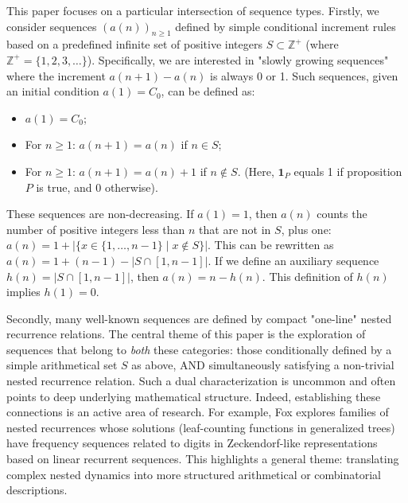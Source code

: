 \documentclass[11pt,a4paper]{article} %
\theoremstyle{remark}
\newcommand{\Zplus}{\mathbb{Z}^+} %
\newcommand{\indicator}[1]{\mathbf{1}_{#1}} %
\begin{document}
This paper focuses on a particular intersection of sequence types. Firstly, we consider sequences $(a(n))_{n \ge 1}$ defined by simple conditional increment rules based on a predefined infinite set of positive integers $S \subset \Zplus$ (where $\Zplus = \{1, 2, 3, \dots\}$). Specifically, we are interested in "slowly growing sequences" where the increment $a(n+1)-a(n)$ is always 0 or 1. Such sequences, given an initial condition $a(1)=C_0$, can be defined as:
\begin{itemize}
    \item $a(1)=C_0$;
    \item For $n \ge 1$: $a(n+1)=a(n)$ if $n \in S$;
    \item For $n \ge 1$: $a(n+1)=a(n)+1$ if $n \notin S$. (Here, $\indicator{P}$ equals 1 if proposition $P$ is true, and 0 otherwise).
\end{itemize}
These sequences are non-decreasing. If $a(1)=1$, then $a(n)$ counts the number of positive integers less than $n$ that are not in $S$, plus one: $a(n) = 1 + |\{x \in \{1, \dots, n-1\} \mid x \notin S\}|$.
This can be rewritten as $a(n) = 1 + (n-1) - |S \cap [1, n-1]|$.
If we define an auxiliary sequence $h(n) = |S \cap [1, n-1]|$, then $a(n)=n-h(n)$. This definition of $h(n)$ implies $h(1)=0$.

Secondly, many well-known sequences are defined by compact "one-line" nested recurrence relations. The central theme of this paper is the exploration of sequences that belong to \emph{both} these categories: those conditionally defined by a simple arithmetical set $S$ as above, AND simultaneously satisfying a non-trivial nested recurrence relation. Such a dual characterization is uncommon and often points to deep underlying mathematical structure. Indeed, establishing these connections is an active area of research. For example, Fox \cite{Fox2022} explores families of nested recurrences whose solutions (leaf-counting functions in generalized trees) have frequency sequences related to digits in Zeckendorf-like representations based on linear recurrent sequences. This highlights a general theme: translating complex nested dynamics into more structured arithmetical or combinatorial descriptions.
\end{document}
